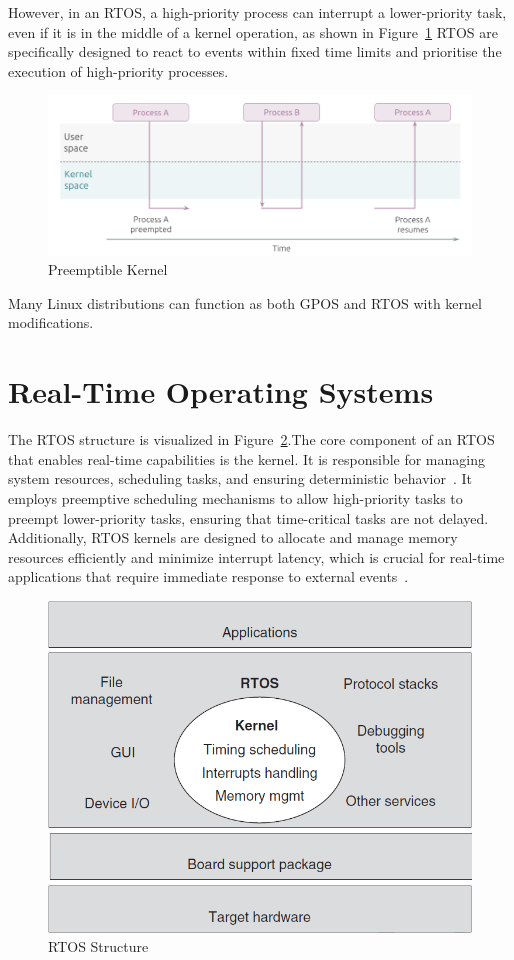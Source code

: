 \documentclass[MMR,Master,english]{twbook}
\begin{document}
\noindent However, in an RTOS, a high-priority process can interrupt a lower-priority task, even if it is in the middle of a kernel operation, as shown in Figure~\ref{fig:kernel_rt} RTOS are specifically designed to react to events within fixed time limits and prioritise the execution of high-priority processes.

\begin{figure}[H]
	\centering
	\includegraphics[width=0.75\columnwidth]{img/introduction/kernel_rt.png}
	\caption[Preemptible Kernel]{Preemptible Kernel~\cite{WhatRealtimeLinux}}
	\label{fig:kernel_rt}
\end{figure}

\noindent Many Linux distributions can function as both GPOS and RTOS with kernel modifications.

\section{Real-Time Operating Systems}
\noindent The RTOS structure is visualized in Figure~\ref{fig:rtos_structure}.The core component of an RTOS that enables real-time capabilities is the kernel. It is responsible for managing system resources, scheduling tasks, and ensuring deterministic behavior~\cite{malallahComprehensiveStudyKernel2021}. It employs preemptive scheduling mechanisms to allow high-priority tasks to preempt lower-priority tasks, ensuring that time-critical tasks are not delayed. Additionally, RTOS kernels are designed to allocate and manage memory resources efficiently and minimize interrupt latency, which is crucial for real-time applications that require immediate response to external events~\cite{wangRealtimeEmbeddedSystems2017}.

\begin{figure}[H]
	\centering
	\includegraphics[width=0.50\columnwidth]{img/introduction/rtos_structure.png}
	\caption[RTOS Structure]{RTOS Structure~\cite{wangRealtimeEmbeddedSystems2017}}
	\label{fig:rtos_structure}
\end{figure}
\end{document}

